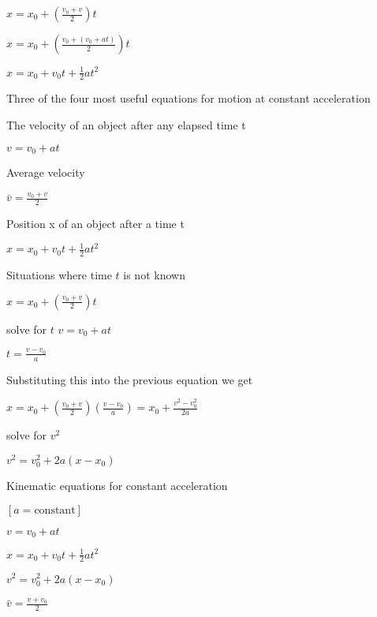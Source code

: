 \documentclass{extarticle}
\begin{document}
\begin{tcolorbox}[enhanced jigsaw,sharp corners,coltext=black,colback=BurntOrange!25!white,boxrule=pt,breakable,size=minimal]
$x = x_0 + (\frac{v_0 + v}{2})t$

$x = x_0 + (\frac{v_0 + (v_0 + at)}{2})t$

$x = x_0 + v_0t + \frac{1}{2}at^2$



Three of the four most useful equations for motion at constant acceleration 

The velocity of an object after any elapsed time t

$v = v_0 + at$

Average velocity

$\bar{v} = \frac{v_0 + v}{2}$

Position x of an object after a time t

$x = x_0 + v_0t + \frac{1}{2}at^2$



Situations where time $t$ is not known

$x = x_0 + (\frac{v_0 + v}{2})t$


solve for $t$
$v = v_0 + at$

$t = \frac{v - v_0}{a}$

Substituting this into the previous equation we get 

$x = x_0 + (\frac{v_0 + v}{2})(\frac{v - v_0}{a}) = x_0 + \frac{v^2 - v_0^2}{2a}$

solve for $v^2$

$v^2 = v_0^2 + 2a(x - x_0)$

\end{tcolorbox}






Kinematic equations for constant acceleration 

$[a = \text{constant}]$

$v = v_0 + at$

$x = x_0 + v_0t + \frac{1}{2}at^2$

$v^2 = v_0^2 + 2a(x - x_0)$

$\bar{v} = \frac{v + v_0}{2}$
\end{document}
